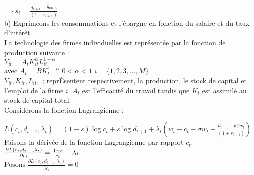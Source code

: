 \documentclass[11pt,twoside,a4paper]{article}
\begin{document}
  $
\Rightarrow s_t=\frac{d_{t+1}-\overline{\theta}\phi w_t}{(1+r_{t+1})}$\\

 
 
 b) Exprimeons les consommations et l'épargne en fonction du salaire et du taux
d'intér\^{e}t.\\
La technologie des firmes individuelles est représentée par la fonction de production suivante :\\
$Y_{it}=A_tK^{\alpha}_{it}L^{1-\alpha}_{it}$\\

avec \: $A_t=BK^{1-\alpha}_t$ \: $0<\alpha<1$ \: $ i=\{ 1,2,3,...,M \}$\\

$Y_{it}, K_{it},L_{it},$ ; reprÈsentent respectivement, la production, le stock de capital et l'emploi de la firme $i$. $A_t$ est l'efficacité du travail tandis que $K_t$ est assimilé au stock de capital total.\\



Considérons la fonction Lagrangienne :

$ L(c_t,d_{t+1},\lambda_t)= (1-s)\log{c_t} + s\log{d_{t+1}} +\lambda_t(w_t-c_t - \sigma w_t-\frac{d_{t+1}-\overline{\theta}\phi w_t}{(1+r_{t+1})})  $  \\

Faisons la dérivée de la fonction Lagrangienne par rapport $c_t :  $ \\

$\\
\frac{\partial L(c_t,d_{t+1},\lambda_t)}{\partial c_t} = \frac{1-s}{c_t} - \lambda_t 
$ \\
Posons  $ \frac{\partial L(c_t,d_{t+1},\lambda_t)}{\partial c_t} = 0  $ \\
\end{document}
